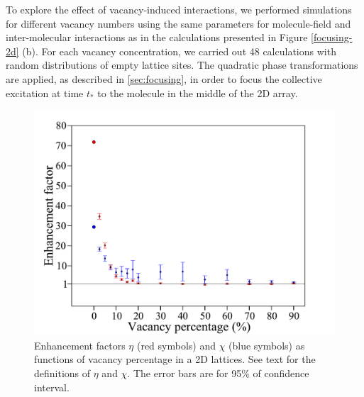 To explore the effect of vacancy-induced interactions, we performed simulations for
different vacancy numbers using the same parameters for molecule-field and inter-molecular interactions as
in the calculations presented in Figure \ref{focusing-2d} (b). For each vacancy concentration, we carried out 48
calculations with random distributions of empty lattice sites. The quadratic phase transformations are applied,
as described in \autoref{sec:focusing}, in order to focus the collective excitation at time $t_{\ast}$ to
the molecule in the middle of the 2D array.

\begin{figure}[htbp]
\centering
\includegraphics[width=\linewidth]{enhancement-vs-vacancy.pdf}
\caption{ Enhancement factors $\eta$ (red symbols) and
$\chi$ (blue symbols) as functions of vacancy percentage in a 2D lattices. See text
for the definitions of $\eta$ and $\chi$. The error bars are for 95\% of confidence interval. 
} 
\label{enhancement-vs-vacancy}
\end{figure}


